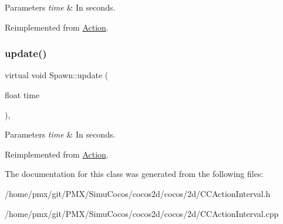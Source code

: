 \begin{DoxyParams}{Parameters}
{\em time} & In seconds. \\
\hline
\end{DoxyParams}


Reimplemented from \hyperlink{classAction_a937e646e63915e33ad05ba149bfcf239}{Action}.

\mbox{\label{classSpawn_a49981c1b744173b40ac032815306bbcc}} 
\subsubsection{\texorpdfstring{update()}{update()}\hspace{0.1cm}{\footnotesize\ttfamily [2/2]}}
{\footnotesize\ttfamily virtual void Spawn\+::update (\begin{DoxyParamCaption}\item[{float}]{time }\end{DoxyParamCaption})\hspace{0.3cm}{\ttfamily [override]}, {\ttfamily [virtual]}}


\begin{DoxyParams}{Parameters}
{\em time} & In seconds. \\
\hline
\end{DoxyParams}


Reimplemented from \hyperlink{classAction_a937e646e63915e33ad05ba149bfcf239}{Action}.



The documentation for this class was generated from the following files\+:\begin{DoxyCompactItemize}
\item 
/home/pmx/git/\+P\+M\+X/\+Simu\+Cocos/cocos2d/cocos/2d/C\+C\+Action\+Interval.\+h\item 
/home/pmx/git/\+P\+M\+X/\+Simu\+Cocos/cocos2d/cocos/2d/C\+C\+Action\+Interval.\+cpp\end{DoxyCompactItemize}
